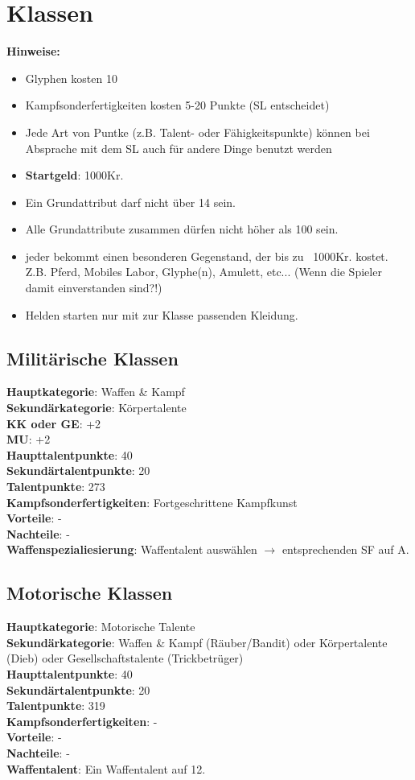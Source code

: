 {\let\clearpage\relax\chapter{Klassen}}
\textbf{Hinweise:}
\begin{itemize}
\item Glyphen kosten 10
\item Kampfsonderfertigkeiten kosten 5-20 Punkte (SL entscheidet)
\item Jede Art von Puntke (z.B. Talent- oder Fähigkeitspunkte) können bei Absprache mit dem SL auch für andere Dinge benutzt werden
\item \textbf{Startgeld}: 1000Kr.
\item Ein Grundattribut darf nicht über 14 sein.
\item Alle Grundattribute zusammen dürfen nicht höher als 100 sein.
\item jeder bekommt einen besonderen Gegenstand, der bis zu ~1000Kr. kostet. Z.B. Pferd, Mobiles Labor, Glyphe(n), Amulett, etc... (Wenn die Spieler damit einverstanden sind?!)
\item Helden starten nur mit zur Klasse passenden Kleidung.
\end{itemize}


\section{Militärische Klassen}
\textbf{Hauptkategorie}: Waffen \& Kampf \\
\textbf{Sekundärkategorie}: Körpertalente \\
\textbf{KK oder GE}: +2 \\
\textbf{MU}: +2 \\
\textbf{Haupttalentpunkte}: 40 \\
\textbf{Sekundärtalentpunkte}: 20 \\
\textbf{Talentpunkte}: 273 \\
\textbf{Kampfsonderfertigkeiten}: Fortgeschrittene Kampfkunst \\
\textbf{Vorteile}: - \\
\textbf{Nachteile}: - \\
\textbf{Waffenspezialiesierung}: Waffentalent auswählen $\rightarrow$ entsprechenden SF auf A.


\section{Motorische Klassen}
\textbf{Hauptkategorie}: Motorische Talente \\
\textbf{Sekundärkategorie}: Waffen \& Kampf (Räuber/Bandit) oder Körpertalente (Dieb) oder Gesellschaftstalente (Trickbetrüger) \\
\textbf{Haupttalentpunkte}: 40 \\
\textbf{Sekundärtalentpunkte}: 20 \\
\textbf{Talentpunkte}: 319 \\
\textbf{Kampfsonderfertigkeiten}: - \\
\textbf{Vorteile}: - \\
\textbf{Nachteile}: - \\
\textbf{Waffentalent}: Ein Waffentalent auf 12.


